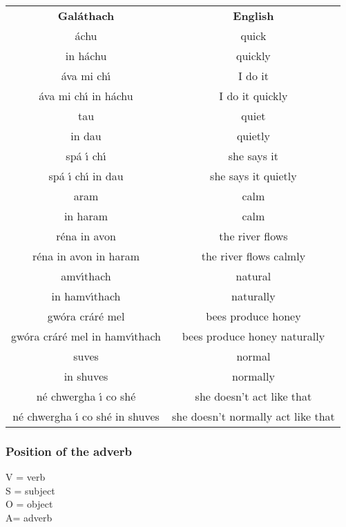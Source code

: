 \begin{table}[H]
\centering
\begin{tabular}{cc}
  \toprule
  \textbf{Gal\'{a}thach} & \textbf{English}\\
  \cmidrule(lr){1-1}\cmidrule(lr){2-2}
  \'{a}chu & quick\\
  in h\'{a}chu & quickly\\
  \'{a}va mi ch\'{\i} & I do it\\
  \'{a}va mi ch\'{\i} in h\'{a}chu & I do it quickly\\
  \cmidrule(lr){1-1}\cmidrule(lr){2-2}
  tau & quiet\\
  in dau & quietly\\
  sp\'{a} \'{\i} ch\'{\i} & she says it\\
  sp\'{a} \'{\i} ch\'{\i} in dau & she says it quietly\\
  \cmidrule(lr){1-1}\cmidrule(lr){2-2}
  aram & calm\\
  in haram & calm\\
  r\'{e}na in avon & the river flows\\
  r\'{e}na in avon in haram & the river flows calmly\\
  \cmidrule(lr){1-1}\cmidrule(lr){2-2}
  amv\'{\i}thach & natural\\
  in hamv\'{\i}thach & naturally\\
  gw\'{o}ra cr\'{a}r\'{e} mel & bees produce honey\\
  gw\'{o}ra cr\'{a}r\'{e} mel in hamv\'{\i}thach & bees produce honey naturally\\
  \cmidrule(lr){1-1}\cmidrule(lr){2-2}
  suves & normal\\
  in shuves & normally\\
  n\'{e} chwergha \'{\i} co sh\'{e} & she doesn't act like that\\
  n\'{e} chwergha \'{\i} co sh\'{e} in shuves & she doesn't normally act like that\\
  \bottomrule
\end{tabular}
\label{examples_adverb}
\end{table}

\subsubsection{Position of the adverb}

V = verb \\
S = subject\\
O = object \\
A= adverb \\

